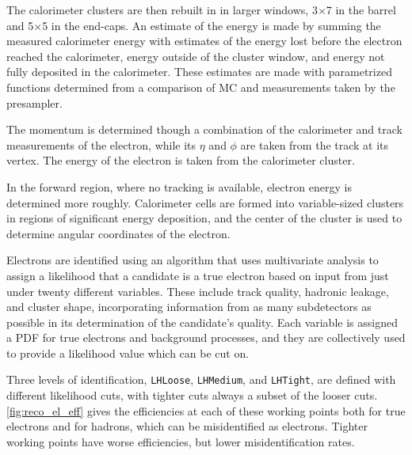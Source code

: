 The calorimeter clusters are then rebuilt in in larger windows, 3$\times$7 in the barrel and 5$\times$5 in the end-caps. An estimate of the energy is made by summing the measured calorimeter energy with estimates of the energy lost before the electron reached the calorimeter, energy outside of the cluster window, and energy not fully deposited in the calorimeter. These estimates are made with parametrized functions determined from a comparison of \ac{MC} and measurements taken by the presampler. 

The momentum is determined though a combination of the calorimeter and track measurements of the electron, while its $\eta$ and $\phi$ are taken from the track at its vertex. The energy of the electron is taken from the calorimeter cluster.

In the forward region, where no tracking is available, electron energy is determined more roughly. Calorimeter cells are formed into variable-sized clusters in regions of significant energy deposition, and the center of the cluster is used to determine angular coordinates of the electron. 

Electrons are identified using an algorithm that uses multivariate analysis to assign a likelihood that a candidate is a true electron based on input from just under twenty different variables. These include track quality, hadronic leakage, and cluster shape, incorporating information from as many subdetectors as possible in its determination of the candidate's quality. Each variable is assigned a \ac{PDF} for true electrons and background processes, and they are collectively used to provide a likelihood value which can be cut on. 

Three levels of identification, \texttt{LHLoose}, \texttt{LHMedium}, and \texttt{LHTight}, are defined with different likelihood cuts, with tighter cuts always a subset of the looser cuts. \autoref{fig:reco_el_eff} gives the efficiencies at each of these working points both for true electrons and for hadrons, which can be misidentified as electrons. Tighter working points have worse efficiencies, but lower misidentification rates. 

